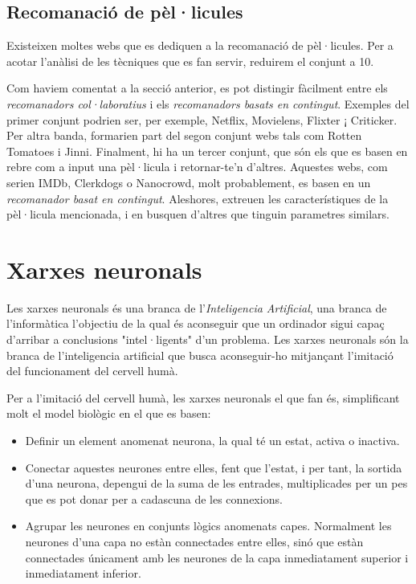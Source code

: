 \subsection{Recomanació de pèl·licules}

Existeixen moltes webs que es dediquen a la recomanació de pèl·licules. Per a acotar l'anàlisi de les tècniques que es fan servir, reduirem el conjunt a 10.\cite{top-ten-film-recommenders}

Com haviem comentat a la secció anterior, es pot distingir fàcilment entre els \emph{recomanadors col·laboratius} i els \emph{recomanadors basats en contingut}. Exemples del primer conjunt podrien ser, per exemple, Netflix, Movielens, Flixter ¡ Criticker. Per altra banda, formarien part del segon conjunt webs tals com Rotten Tomatoes i Jinni. Finalment, hi ha un tercer conjunt, que són els que es basen en rebre com a input una pèl·licula i retornar-te'n d'altres. Aquestes webs, com serien IMDb, Clerkdogs o Nanocrowd, molt probablement, es basen en un \emph{recomanador basat en contingut}. Aleshores, extreuen les característiques de la pèl·licula mencionada, i en busquen d'altres que tinguin parametres similars.

\section{Xarxes neuronals}

Les xarxes neuronals és una branca de l'\emph{Inteligencia Artificial}, una branca de l'informàtica l'objectiu de la qual és aconseguir que un ordinador sigui capaç d'arribar a conclusions "intel·ligents" d'un problema. Les xarxes neuronals són la branca de l'inteligencia artificial que busca aconseguir-ho mitjançant l'imitació del funcionament del cervell humà.

Per a l'imitació del cervell humà, les xarxes neuronals el que fan és, simplificant molt el model biològic en el que es basen:

\begin{itemize}
	\item Definir un element anomenat neurona, la qual té un estat, activa o inactiva.
	\item Conectar aquestes neurones entre elles, fent que l'estat, i per tant, la sortida d'una neurona, depengui de la suma de les entrades, multiplicades per un pes que es pot donar per a cadascuna de les connexions.
	\item Agrupar les neurones en conjunts lògics anomenats capes. Normalment les neurones d'una capa no estàn connectades entre elles, sinó que estàn connectades únicament amb les neurones de la capa inmediatament superior i inmediatament inferior.
\end{itemize}

